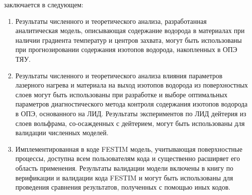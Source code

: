 {\influence} заключается в следующем:
\begin{enumerate}[beginpenalty=10000] %
    \item Результаты численного и теоретического анализа, разработанная аналитическая модель, описывающая содержание водорода в материалах при наличии градиента температур и центров захвата, могут быть использованы при прогнозировании содержания изотопов водорода, накопленных в ОПЭ ТЯУ.
    \item Результаты численного и теоретического анализа влияния параметров лазерного нагрева и материала на выход изотопов водорода из поверхностных слоев могут быть использованы при разработке и выборе оптимальных параметров диагностического метода контроля содержания изотопов водорода в ОПЭ, основанного на ЛИД.      Результаты экспериментов по ЛИД дейтерия из слоев вольфрама, со-осажденных с дейтерием, могут быть использованы для валидации численных моделей.
    \item Имплементированная в коде FESTIM модель, учитывающая поверхностные процессы, доступна всем пользователям кода и существенно расширяет его область применения. Результаты валидации модели включены в книгу по верификации и валидации кода FESTIM и могут быть использованы для проведения сравнения результатов, полученных с помощью иных кодов.
\end{enumerate}

